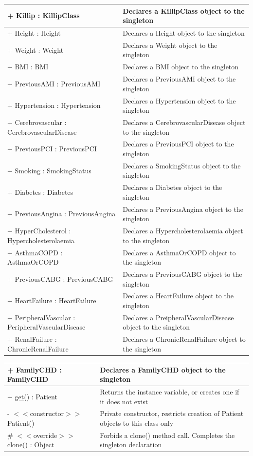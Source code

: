 \documentclass[12pt,a4paper,oneside,titlepage]{article}
\begin{document}
\begin{center}
	\begin{tabular}{| p{13cm} | p{5cm} |}
	\hline
+ Killip : KillipClass & 	Declares a KillipClass object to the singleton\\ \hline
+ Height : Height	 & Declares a Height object to the singleton\\ \hline
+ Weight : Weight & 	Declares a Weight object to the singleton\\ \hline
+ BMI : BMI	 & Declares a BMI object to the singleton\\ \hline
+ PreviousAMI : PreviousAMI	 & Declares a PreviousAMI object to the singleton\\ \hline
+ Hypertension : Hypertension	 & Declares a Hypertension object to the singleton\\ \hline
+ Cerebrovascular : CerebrovascularDisease	 & Declares a CerebrovascularDisease object to the singleton\\ \hline
+ PreviousPCI : PreviousPCI	 & Declares a PreviousPCI object to the singleton\\ \hline
+ Smoking : SmokingStatus	 & Declares a SmokingStatus object to the singleton\\ \hline
+ Diabetes : Diabetes & 	Declares a Diabetes object to the singleton\\ \hline
+ PreviousAngina : PreviousAngina	 & Declares a PreviousAngina object to the singleton\\ \hline
+ HyperCholesterol : Hypercholesterolaemia	 & Declares a Hypercholesterolaemia object to the singleton\\ \hline
+ AsthmaCOPD : AsthmaOrCOPD	 & Declares a AsthmaOrCOPD object to the singleton\\ \hline
+ PreviousCABG : PreviousCABG	 & Declares a PreviousCABG object to the singleton\\ \hline
+ HeartFailure : HeartFailure & 	Declares a HeartFailure object to the singleton\\ \hline
+ PeripheralVascular : PeripheralVascularDisease	 & Declares a PreipheralVascularDisease object to the singleton\\ \hline
+ RenalFailure : ChronicRenalFailure	 & Declares a ChronicRenalFailure object to the singleton\\ \hline
\end{tabular}
\end{center}

\begin{center}
	\begin{tabular}{| p{13cm} | p{5cm} |}
	\hline
+ FamilyCHD : FamilyCHD	 & Declares a FamilyCHD object to the singleton\\ \hline \hline
+ \underline{get}() : Patient	 & Returns the instance variable, or creates one if it does not exist\\ \hline
- $<<$constructor$>>$ Patient()	 & Private constructor, restricts creation of Patient objects to this class only\\ \hline
\# $<<$override$>>$ clone() : Object & 	Forbids a clone() method call. Completes the singleton declaration\\ \hline
	\end{tabular}
\end{center}
\end{document}
